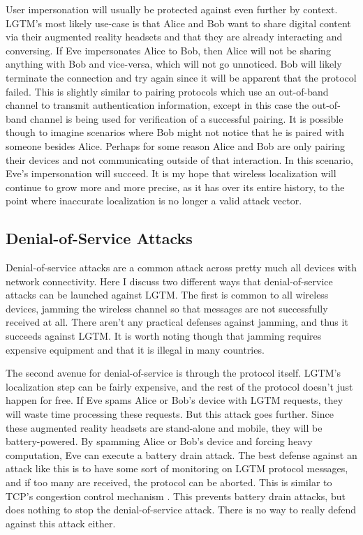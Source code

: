 \documentclass[12pt]{report}
\begin{document}
User impersonation will usually be protected against even further by context. LGTM's most likely use-case is that Alice and Bob want to share digital content via their augmented reality headsets and that they are already interacting and conversing. If Eve impersonates Alice to Bob, then Alice will not be sharing anything with Bob and vice-versa, which will not go unnoticed. Bob will likely terminate the connection and try again since it will be apparent that the protocol failed. This is slightly similar to pairing protocols which use an out-of-band channel to transmit authentication information, except in this case the out-of-band channel is being used for verification of a successful pairing. It is possible though to imagine scenarios where Bob might not notice that he is paired with someone besides Alice. Perhaps for some reason Alice and Bob are only pairing their devices and not communicating outside of that interaction. In this scenario, Eve's impersonation will succeed. It is my hope that wireless localization will continue to grow more and more precise, as it has over its entire history, to the point where inaccurate localization is no longer a valid attack vector. \par

\subsection{Denial-of-Service Attacks}
Denial-of-service attacks are a common attack across pretty much all devices with network connectivity. Here I discuss two different ways that denial-of-service attacks can be launched against LGTM. The first is common to all wireless devices, jamming the wireless channel so that messages are not successfully received at all. There aren't any practical defenses against jamming, and thus it succeeds against LGTM. It is worth noting though that jamming requires expensive equipment and that it is illegal in many countries. \par

The second avenue for denial-of-service is through the protocol itself. LGTM's localization step can be fairly expensive, and the rest of the protocol doesn't just happen for free. If Eve spams Alice or Bob's device with LGTM requests, they will waste time processing these requests. But this attack goes further. Since these augmented reality headsets are stand-alone and mobile, they will be battery-powered. By spamming Alice or Bob's device and forcing heavy computation, Eve can execute a battery drain attack. The best defense against an attack like this is to have some sort of monitoring on LGTM protocol messages, and if too many are received, the protocol can be aborted. This is similar to TCP's congestion control mechanism \cite{TcpCongestionControl2009}. This prevents battery drain attacks, but does nothing to stop the denial-of-service attack. There is no way to really defend against this attack either. \par
\end{document}
